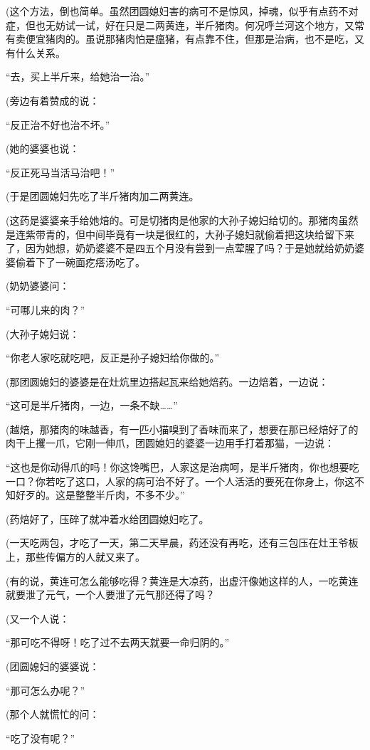 \par (这个方法，倒也简单。虽然团圆媳妇害的病可不是惊风，掉魂，似乎有点药不对症，但也无妨试一试，好在只是二两黄连，半斤猪肉。何况呼兰河这个地方，又常有卖便宜猪肉的。虽说那猪肉怕是瘟猪，有点靠不住，但那是治病，也不是吃，又有什么关系。
\par “去，买上半斤来，给她治一治。”
\par (旁边有着赞成的说：
\par “反正治不好也治不坏。”
\par (她的婆婆也说：
\par “反正死马当活马治吧！”
\par (于是团圆媳妇先吃了半斤猪肉加二两黄连。
\par (这药是婆婆亲手给她焙的。可是切猪肉是他家的大孙子媳妇给切的。那猪肉虽然是连紫带青的，但中间毕竟有一块是很红的，大孙子媳妇就偷着把这块给留下来了，因为她想，奶奶婆婆不是四五个月没有尝到一点荤腥了吗？于是她就给奶奶婆婆偷着下了一碗面疙瘩汤吃了。
\par (奶奶婆婆问：
\par “可哪儿来的肉？”
\par (大孙子媳妇说：
\par “你老人家吃就吃吧，反正是孙子媳妇给你做的。”
\par (那团圆媳妇的婆婆是在灶炕里边搭起瓦来给她焙药。一边焙着，一边说：
\par “这可是半斤猪肉，一边，一条不缺……”
\par (越焙，那猪肉的味越香，有一匹小猫嗅到了香味而来了，想要在那已经焙好了的肉干上攫一爪，它刚一伸爪，团圆媳妇的婆婆一边用手打着那猫，一边说：
\par “这也是你动得爪的吗！你这馋嘴巴，人家这是治病呵，是半斤猪肉，你也想要吃一口？你若吃了这口，人家的病可治不好了。一个人活活的要死在你身上，你这不知好歹的。这是整整半斤肉，不多不少。”
\par (药焙好了，压碎了就冲着水给团圆媳妇吃了。
\par (一天吃两包，才吃了一天，第二天早晨，药还没有再吃，还有三包压在灶王爷板上，那些传偏方的人就又来了。
\par (有的说，黄连可怎么能够吃得？黄连是大凉药，出虚汗像她这样的人，一吃黄连就要泄了元气，一个人要泄了元气那还得了吗？
\par (又一个人说：
\par “那可吃不得呀！吃了过不去两天就要一命归阴的。”
\par (团圆媳妇的婆婆说：
\par “那可怎么办呢？”
\par (那个人就慌忙的问：
\par “吃了没有呢？”
